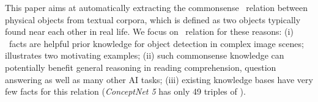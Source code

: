 This paper aims at automatically extracting the commonsense \lnear\ relation between
physical objects from textual corpora, which is defined as two objects typically found near each other in real life.
We focus on \lnear\ relation for these reasons:  
	(i) \lnear\ facts are helpful prior knowledge for object detection in complex image scenes;  illustrates two motivating examples;
	(ii) such commonsense knowledge can potentially benefit general reasoning in reading comprehension,
	question answering as well as many other AI tasks;
	(iii) existing knowledge bases have very few facts for	this relation (\textit{ConceptNet 5} has only 49 triples of \lnear). 

